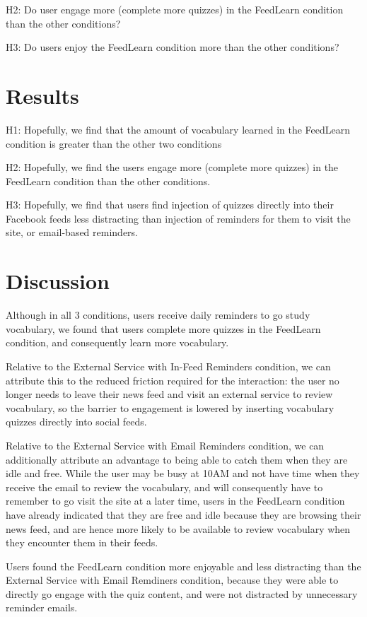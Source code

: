 \documentclass{sigchi}
\begin{document}
H2: Do user engage more (complete more quizzes) in the FeedLearn condition than the other conditions?

H3: Do users enjoy the FeedLearn condition more than the other conditions?

\section{Results}

H1: Hopefully, we find that the amount of vocabulary learned in the FeedLearn condition is greater than the other two conditions

H2: Hopefully, we find the users engage more (complete more quizzes) in the FeedLearn condition than the other conditions.

H3: Hopefully, we find that users find injection of quizzes directly into their Facebook feeds less distracting than injection of reminders for them to visit the site, or email-based reminders.

\section{Discussion}

Although in all 3 conditions, users receive daily reminders to go study vocabulary, we found that users complete more quizzes in the FeedLearn condition, and consequently learn more vocabulary.

Relative to the External Service with In-Feed Reminders condition, we can attribute this to the reduced friction required for the interaction: the user no longer needs to leave their news feed and visit an external service to review vocabulary, so the barrier to engagement is lowered by inserting vocabulary quizzes directly into social feeds.

Relative to the External Service with Email Reminders condition, we can additionally attribute an advantage to being able to catch them when they are idle and free. While the user may be busy at 10AM and not have time when they receive the email to review the vocabulary, and will consequently have to remember to go visit the site at a later time, users in the FeedLearn condition have already indicated that they are free and idle because they are browsing their news feed, and are hence more likely to be available to review vocabulary when they encounter them in their feeds.

Users found the FeedLearn condition more enjoyable and less distracting than the External Service with Email Remdiners condition, because they were able to directly go engage with the quiz content, and were not distracted by unnecessary reminder emails.
\end{document}

